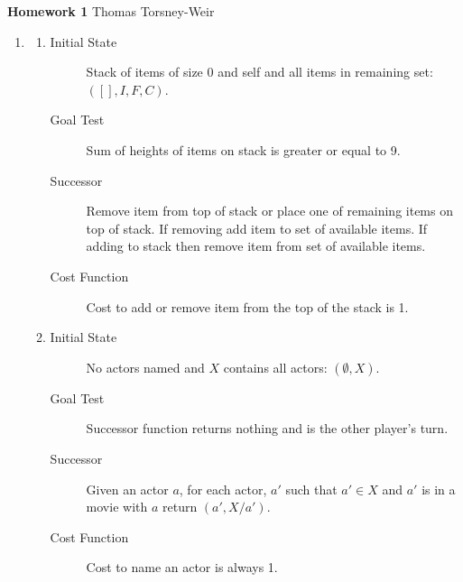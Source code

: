 \documentclass[10pt]{article}
\begin{document}
{\bf Homework 1} \hfill {\raggedleft Thomas Torsney-Weir}

\begin{enumerate}
\item %
  \begin{enumerate}
  \item %
    \begin{description}
    \item[Initial State]
      Stack of items of size 0 and self and all items in remaining set:
      $([], {I, F, C})$.
    \item[Goal Test]
      Sum of heights of items on stack is greater or equal to 9.
    \item[Successor]
      Remove item from top of stack or place one of remaining items on 
      top of stack.  If removing add item to set of available items.  If
      adding to stack then remove item from set of available items.
    \item[Cost Function]
      Cost to add or remove item from the top of the stack is 1.
    \end{description}
  \item %
    \begin{description}
    \item[Initial State]
      No actors named and $X$ contains all actors: $(\emptyset, X)$.
    \item[Goal Test]
      Successor function returns nothing and is the other player's turn.
    \item[Successor]
      Given an actor $a$, for each actor, $a'$ such that $a' \in X$ and $a'$
      is in a movie with $a$ return $(a', X / a')$.
    \item[Cost Function]
      Cost to name an actor is always 1.
    \end{description}
  \end{enumerate}
  

\end{enumerate}
\end{document}
